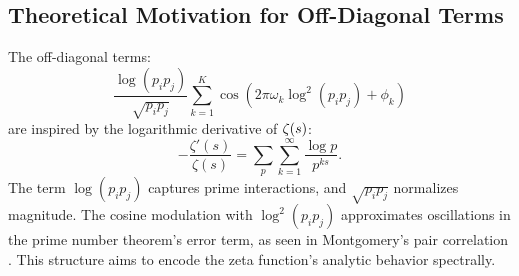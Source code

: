 
\subsection*{Theoretical Motivation for Off-Diagonal Terms}
The off-diagonal terms:
\[
\frac{\log(p_i p_j)}{\sqrt{p_i p_j}} \sum_{k=1}^{K} \cos\left(2\pi \omega_k \log^2(p_i p_j) + \phi_k\right)
\]
are inspired by the logarithmic derivative of \(\zeta(s)\):
\[
-\frac{\zeta'(s)}{\zeta(s)} = \sum_p \sum_{k=1}^\infty \frac{\log p}{p^{ks}}.
\]
The term \( \log(p_i p_j) \) captures prime interactions, and \( \sqrt{p_i p_j} \) normalizes magnitude. The cosine modulation with \( \log^2(p_i p_j) \) approximates oscillations in the prime number theorem's error term, as seen in Montgomery's pair correlation \cite{Montgomery1973}. This structure aims to encode the zeta function's analytic behavior spectrally.